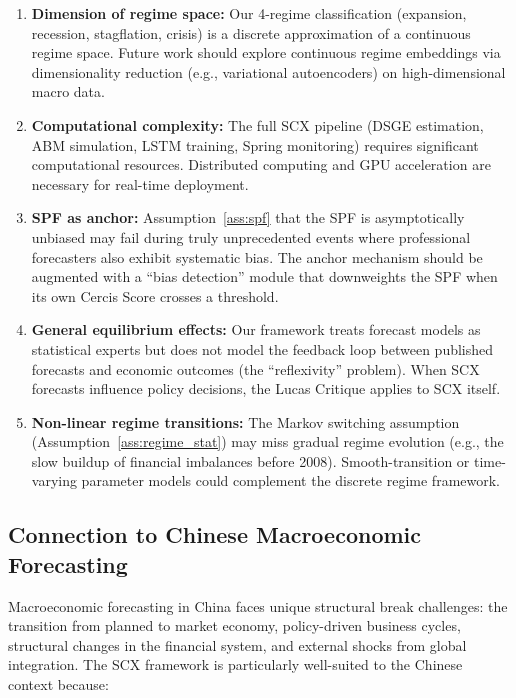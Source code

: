 \documentclass[12pt,a4paper]{article}
\begin{document}
\begin{enumerate}[label=(\arabic*), leftmargin=*]
    \item \textbf{Dimension of regime space:} Our 4-regime
    classification (expansion, recession, stagflation, crisis) is a
    discrete approximation of a continuous regime space.  Future
    work should explore continuous regime embeddings via
    dimensionality reduction (e.g., variational autoencoders) on
    high-dimensional macro data.

    \item \textbf{Computational complexity:} The full SCX pipeline
    (DSGE estimation, ABM simulation, LSTM training, Spring
    monitoring) requires significant computational resources.
    Distributed computing and GPU acceleration are necessary for
    real-time deployment.

    \item \textbf{SPF as anchor:} Assumption~\ref{ass:spf} that the
    SPF is asymptotically unbiased may fail during truly
    unprecedented events where professional forecasters also exhibit
    systematic bias.  The anchor mechanism should be augmented with
    a ``bias detection'' module that downweights the SPF when its
    own Cercis Score crosses a threshold.

    \item \textbf{General equilibrium effects:} Our framework treats
    forecast models as statistical experts but does not model the
    feedback loop between published forecasts and economic outcomes
    (the ``reflexivity'' problem).  When SCX forecasts influence
    policy decisions, the Lucas Critique applies to SCX itself.

    \item \textbf{Non-linear regime transitions:} The Markov switching
    assumption (Assumption~\ref{ass:regime_stat}) may miss gradual
    regime evolution (e.g., the slow buildup of financial imbalances
    before 2008).  Smooth-transition or time-varying parameter models
    could complement the discrete regime framework.
\end{enumerate}

\subsection{Connection to Chinese Macroeconomic Forecasting}
\label{sec:chinese_context}

Macroeconomic forecasting in China faces unique structural
break challenges: the transition from planned to market
economy, policy-driven business cycles,
structural changes in the financial system,
and external shocks from global
integration.  The SCX framework is particularly well-suited to the
Chinese context because:
\end{document}
